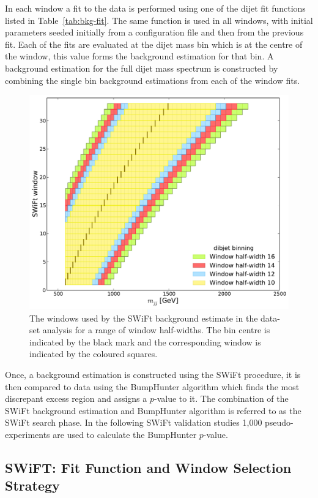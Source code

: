 In each window a fit to the data is performed using one of the dijet fit functions listed in Table~\ref{tab:bkg-fit}.
The same function is used in all windows, with initial parameters seeded initially from a configuration file and then from the previous fit.
Each of the fits are evaluated at the dijet mass bin which is at the centre of the window, this value forms the background estimation for that bin.
A background estimation for the full dijet mass spectrum is constructed by combining the single bin background estimations from each of the window fits.

\begin{figure}[!htb]
\centering
\includegraphics[width=0.6\linewidth, angle=0]{figs/Dibjet/LowMass/evt-swiftBins_min566_fl0_fh0_tr0.pdf}
\caption{\label{fig:bkg-lm_swiftBins}
  The windows used by the SWiFt background estimate in the \lm{} data-set analysis for a range of window half-widths.
  The bin centre is indicated by the black mark and the corresponding window is indicated by the coloured squares.}
\end{figure}

Once, a background estimation is constructed using the SWiFt procedure,
it is then compared to data using the {\sc BumpHunter} algorithm which finds the most discrepant excess region and assigns a \mbox{$p$-value} to it.
The combination of the SWiFt background estimation and {\sc BumpHunter} algorithm is referred to as the SWiFt search phase.
In the following SWiFt validation studies 1,000 pseudo-experiments are used to calculate the {\sc BumpHunter} \mbox{$p$-value}.

\subsection{SWiFT: Fit Function and Window Selection Strategy}
\label{sec:bkg-full_windowSel}

